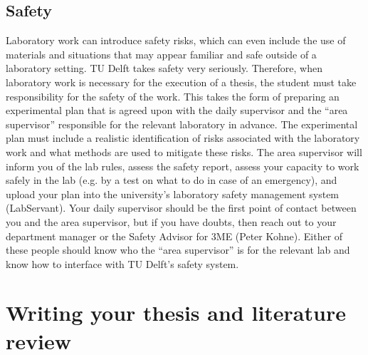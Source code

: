 \documentclass{article}
\begin{document}
\subsection{Safety}
Laboratory work can introduce safety risks, which can even include the use of materials and situations that may appear familiar and safe outside of a laboratory setting. TU Delft takes safety very seriously. Therefore, when laboratory work is necessary for the execution of a thesis, the student must take responsibility for the safety of the work. This takes the form of preparing an experimental plan that is agreed upon with the daily supervisor and the “area supervisor” responsible for the relevant laboratory in advance. The experimental plan must include a realistic identification of risks associated with the laboratory work and what methods are used to mitigate these risks. The area supervisor will inform you of the lab rules, assess the safety report, assess your capacity to work safely in the lab (e.g. by a test on what to do in case of an emergency), and upload your plan into the university’s laboratory safety management system (LabServant). Your daily supervisor should be the first point of contact between you and the area supervisor, but if you have doubts, then reach out to your department manager or the Safety Advisor for 3ME (Peter Kohne).  Either of these people should know who the “area supervisor” is for the relevant lab and know how to interface with TU Delft’s safety system.

\section{Writing your thesis and literature review} 
\end{document}
